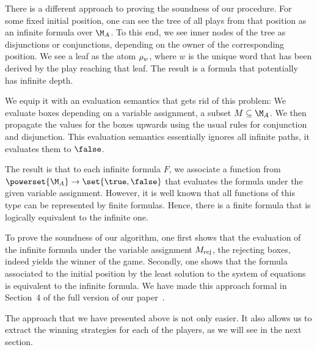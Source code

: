 \documentclass[../../diss.tex]{subfiles}
\begin{document}
\begin{remark}
    There is a different approach to proving the soundness of our procedure.
    For some fixed initial position, one can see the tree of all plays from that position as an infinite formula over $\nfatransmonoid{A}$.
    To this end, we see inner nodes of the tree as disjunctions or conjunctions, depending on the owner of the corresponding position.
    We see a leaf as the atom $\tbox{w}$, where $w$ is the unique word that has been derived by the play reaching that leaf.
    The result is a formula that potentially has infinite depth.

    We equip it with an evaluation semantics that gets rid of this problem:
    We evaluate boxes depending on a variable assignment, \ie a subset $M \subseteq \nfatransmonoid{A}$.
    We then propagate the values for the boxes upwards using the usual rules for conjunction and disjunction.
    This evaluation semantics essentially ignores all infinite paths, \ie it evaluates them to $\false$.

    The result is that to each infinite formula $F$, we associate a function from $\powerset{\nfatransmonoid{A}} \to \set{\true,\false}$ that evaluates the formula under the given variable assignment.
    However, it is well known that all functions of this type can be represented by finite formulas.
    Hence, there is a finite formula that is logically equivalent to the infinite one.

    To prove the soundness of our algorithm, one first shows that the evaluation of the infinite formula under the variable assignment $M_{\text{rej}}$, the rejecting boxes, indeed yields the winner of the game.
    Secondly, one shows that the formula associated to the initial position by the least solution to the system of equations is equivalent to the infinite formula.
    We have made this approach formal in Section~4 of the full version of our paper~\cite{HolikMM16a}.

    The approach that we have presented above is not only easier.
    It also allows us to extract the winning strategies for each of the players, as we will see in the next section.
\end{remark}
\end{document}
